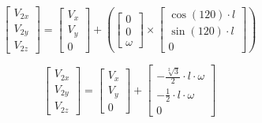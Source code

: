 \documentclass[answers]{exam}
\begin{document}
\begin{questions}
\begin{parts}
\begin{solution}
            \begin{equation*}
                \begin{bmatrix}
                    V_{2x} \\
                    V_{2y} \\
                    V_{2z}
                \end{bmatrix}
                = \begin{bmatrix}
                    V_x \\
                    V_y \\
                    0
                \end{bmatrix}
                + \left(\begin{bmatrix}
                    0 \\
                    0 \\
                    \omega
                \end{bmatrix} \times \begin{bmatrix}
                    \cos(120) \cdot l \\
                    \sin(120) \cdot l \\
                    0
                \end{bmatrix}\right)
            \end{equation*}

            \begin{equation*}
                \begin{bmatrix}
                    V_{2x} \\
                    V_{2y} \\
                    V_{2z}
                \end{bmatrix}
                = \begin{bmatrix}
                    V_x \\
                    V_y \\
                    0
                \end{bmatrix}
                + \begin{bmatrix}
                    - \frac{\sqrt[2]{3}}{2} \cdot l \cdot \omega \\
                    - \frac{1}{2} \cdot l \cdot \omega           \\
                    0
                \end{bmatrix}
            \end{equation*}


\end{solution}
\end{parts}
\end{questions}
\end{document}
